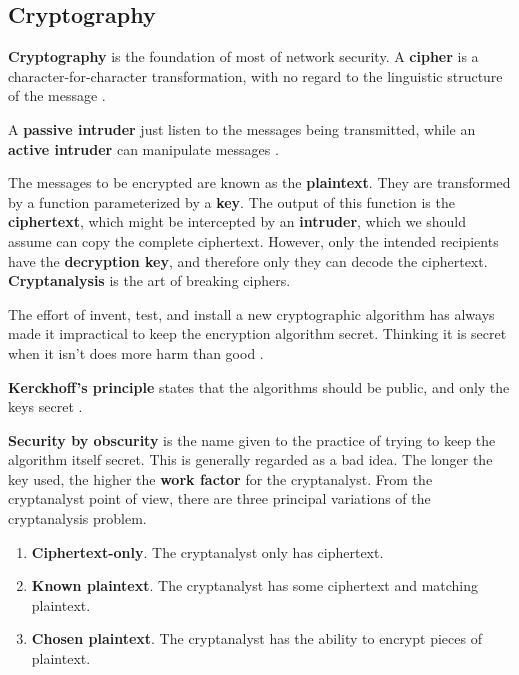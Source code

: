 \subsection{Cryptography}

\textbf{Cryptography} is the foundation of most of network security.
A \textbf{cipher} is a character-for-character transformation, with no regard to the linguistic structure of the message \cite[p.~766]{computer-networks-tanenbaum-2012}.

A \textbf{passive intruder} just listen to the messages being transmitted, while an \textbf{active intruder} can manipulate messages \cite[p.~767]{computer-networks-tanenbaum-2012}.

The messages to be encrypted are known as the \textbf{plaintext}. They are transformed by a function parameterized by a \textbf{key}.
The output of this function is the \textbf{ciphertext}, which might be intercepted by an \textbf{intruder}, which we should assume can copy the complete ciphertext.
However, only the intended recipients have the \textbf{decryption key}, and therefore only they can decode the ciphertext.
\textbf{Cryptanalysis} is the art of breaking ciphers.

The effort of invent, test, and install a new cryptographic algorithm has always made it impractical to keep the encryption algorithm secret.
Thinking it is secret when it isn't does more harm than good \cite[p.~768]{computer-networks-tanenbaum-2012}.

\textbf{Kerckhoff's principle} states that the algorithms should be public, and only the keys secret \cite[p.~768]{computer-networks-tanenbaum-2012}.

\textbf{Security by obscurity} is the name given to the practice of trying to keep the algorithm itself secret.
This is generally regarded as a bad idea. The longer the key used, the higher the \textbf{work factor} for the cryptanalyst.
From the cryptanalyst point of view, there are three principal variations of the cryptanalysis problem.

\begin{enumerate}
    \item \textbf{Ciphertext-only}. The cryptanalyst only has ciphertext.
    \item \textbf{Known plaintext}. The cryptanalyst has some ciphertext and matching plaintext.
    \item \textbf{Chosen plaintext}. The cryptanalyst has the ability to encrypt pieces of plaintext.
\end{enumerate}

